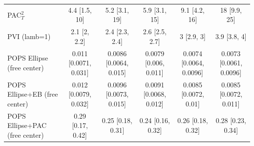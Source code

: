 \begin{tabular}{lccccc}
PAC$^2_T$ & 4.4 {\scriptsize[1.5, 10]} & 5.2 {\scriptsize[3.1, 19]} & 5.9 {\scriptsize[3.1, 15]} & 9.1 {\scriptsize[4.2, 16]} & 18 {\scriptsize[9.9, 25]} \\
PVI (lamb=1) & 2.1 {\scriptsize[2, 2.2]} & 2.4 {\scriptsize[2.3, 2.4]} & 2.6 {\scriptsize[2.5, 2.7]} & 3 {\scriptsize[2.9, 3]} & 3.9 {\scriptsize[3.8, 4]} \\
POPS Ellipse (free center) & 0.011 {\scriptsize[0.0071, 0.031]} & 0.0086 {\scriptsize[0.0064, 0.015]} & 0.0079 {\scriptsize[0.006, 0.011]} & 0.0074 {\scriptsize[0.0064, 0.0096]} & 0.0073 {\scriptsize[0.0061, 0.0096]} \\
POPS Ellipse+EB (free center) & 0.012 {\scriptsize[0.0079, 0.032]} & 0.0096 {\scriptsize[0.0073, 0.015]} & 0.0091 {\scriptsize[0.0068, 0.012]} & 0.0085 {\scriptsize[0.0072, 0.01]} & 0.0085 {\scriptsize[0.0072, 0.011]} \\
POPS Ellipse+PAC (free center) & 0.29 {\scriptsize[0.17, 0.42]} & 0.25 {\scriptsize[0.18, 0.31]} & 0.24 {\scriptsize[0.16, 0.32]} & 0.26 {\scriptsize[0.18, 0.32]} & 0.28 {\scriptsize[0.23, 0.34]} \\
\bottomrule
\end{tabular}

